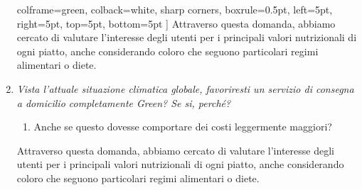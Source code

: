\documentclass{article}
\begin{document}
\begin{enumerate}
\begin{tcolorbox}
            colframe=green,  %
            colback=white,  %
            sharp corners,  %
            boxrule=0.5pt,  %
            left=5pt,  %
            right=5pt,  %
            top=5pt,  %
            bottom=5pt  %
        ]
        Attraverso questa domanda, abbiamo cercato di valutare l'interesse degli utenti per i principali valori nutrizionali di ogni piatto, anche considerando coloro che seguono particolari regimi alimentari o diete.
        \end{tcolorbox}
    \newpage
    \item \textit{Vista l'attuale situazione climatica globale, favoriresti un servizio di consegna a domicilio completamente Green? Se si, perché? }
        \begin{enumerate}
            \item Anche se questo dovesse comportare dei costi leggermente maggiori?
        \end{enumerate}
        \begin{tcolorbox}[
            colframe=green,  %
            colback=white,  %
            sharp corners,  %
            boxrule=0.5pt,  %
            left=5pt,  %
            right=5pt,  %
            top=5pt,  %
            bottom=5pt  %
        ]
        Attraverso questa domanda, abbiamo cercato di valutare l'interesse degli utenti per i principali valori nutrizionali di ogni piatto, anche considerando coloro che seguono particolari regimi alimentari o diete.
        \end{tcolorbox}
\end{enumerate}
\vspace{1cm}\par
{}\vspace{0.5cm}
\end{document}
